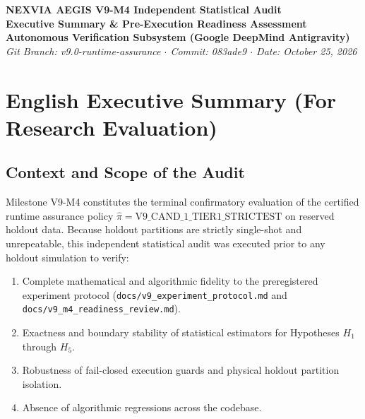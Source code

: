 \documentclass[10pt,a4paper]{article}
\begin{document}
\begin{center}
    {\LARGE \textbf{NEXVIA AEGIS V9-M4 Independent Statistical Audit}}\\[6pt]
    {\Large \textbf{Executive Summary \& Pre-Execution Readiness Assessment}}\\[10pt]
    \textbf{Autonomous Verification Subsystem (Google DeepMind Antigravity)}\\
    \textit{Git Branch: v9.0-runtime-assurance \quad $\cdot$ \quad Commit: 083ade9 \quad $\cdot$ \quad Date: October 25, 2026}\\[12pt]
\end{center}

\noindent{}

\vspace{10pt}

\section{English Executive Summary (For Research Evaluation)}

\subsection{Context and Scope of the Audit}
Milestone V9-M4 constitutes the terminal confirmatory evaluation of the certified runtime assurance policy $\hat{\pi} = \text{V9\_CAND\_1\_TIER1\_STRICTEST}$ on reserved holdout data. Because holdout partitions are strictly single-shot and unrepeatable, this independent statistical audit was executed prior to any holdout simulation to verify:
\begin{enumerate}
    \item Complete mathematical and algorithmic fidelity to the preregistered experiment protocol (\texttt{docs/v9\_experiment\_protocol.md} and \texttt{docs/v9\_m4\_readiness\_review.md}).
    \item Exactness and boundary stability of statistical estimators for Hypotheses $H_1$ through $H_5$.
    \item Robustness of fail-closed execution guards and physical holdout partition isolation.
    \item Absence of algorithmic regressions across the codebase.
\end{enumerate}
\end{document}
